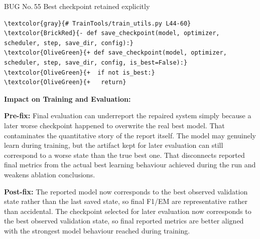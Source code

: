 \documentclass[10pt]{article}
\newcommand{\FieldLabel}[1]{%
 {\bfseries #1:}\par
}
\begin{document}
\begin{bugbox}{BUG No.\,55 \quad Best checkpoint retained explicitly}
\begin{Verbatim}[commandchars=\\\{\},fontsize=\footnotesize,breaklines=true,breaksymbol={},frame=leftline,framerule=2pt,rulecolor=\color{gray!40},xleftmargin=6pt,formatcom=\singlespacing]
\textcolor{gray}{# TrainTools/train_utils.py L44-60}
\textcolor{BrickRed}{- def save_checkpoint(model, optimizer, scheduler, step, save_dir, config):}
\textcolor{OliveGreen}{+ def save_checkpoint(model, optimizer, scheduler, step, save_dir, config, is_best=False):}
\textcolor{OliveGreen}{+  if not is_best:}
\textcolor{OliveGreen}{+   return}
\end{Verbatim}
\vspace{0.22em}
\FieldLabel{Impact on Training and Evaluation}
\textbf{Pre-fix:} Final evaluation can underreport the repaired system simply because a later worse checkpoint happened to overwrite the real best model. That contaminates the quantitative story of the report itself. The model may genuinely learn during training, but the artifact kept for later evaluation can still correspond to a worse state than the true best one. That disconnects reported final metrics from the actual best learning behaviour achieved during the run and weakens ablation conclusions.\par\smallskip
\textbf{Post-fix:} The reported model now corresponds to the best observed validation state rather than the last saved state, so final F1/EM are representative rather than accidental. The checkpoint selected for later evaluation now corresponds to the best observed validation state, so final reported metrics are better aligned with the strongest model behaviour reached during training.
\par
\vspace{0.35em}
\end{bugbox}
\end{document}
